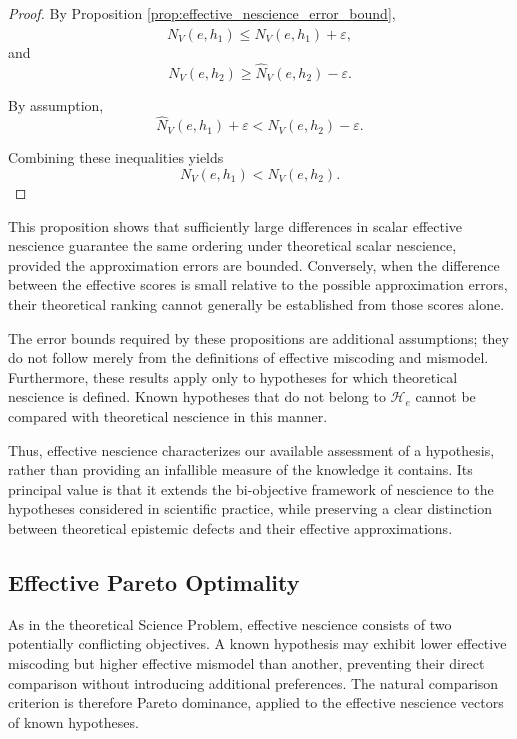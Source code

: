 \begin{proof}
By Proposition
\ref{prop:effective_nescience_error_bound},
\[
N_V(e,h_1)
\leq
\widehat N_V(e,h_1)+\varepsilon,
\]
and
\[
N_V(e,h_2)
\geq
\widehat N_V(e,h_2)-\varepsilon.
\]

By assumption,
\[
\widehat N_V(e,h_1)+\varepsilon
<
\widehat N_V(e,h_2)-\varepsilon.
\]

Combining these inequalities yields
\[
N_V(e,h_1)<N_V(e,h_2).
\]
\end{proof}

This proposition shows that sufficiently large differences in scalar effective nescience guarantee the same ordering under theoretical scalar nescience, provided the approximation errors are bounded. Conversely, when the difference between the effective scores is small relative to the possible approximation errors, their theoretical ranking cannot generally be established from those scores alone.

The error bounds required by these propositions are additional assumptions; they do not follow merely from the definitions of effective miscoding and mismodel. Furthermore, these results apply only to hypotheses for which theoretical nescience is defined. Known hypotheses that do not belong to $\mathcal H_e$ cannot be compared with theoretical nescience in this manner.

Thus, effective nescience characterizes our available assessment of a hypothesis, rather than providing an infallible measure of the knowledge it contains. Its principal value is that it extends the bi-objective framework of nescience to the hypotheses considered in scientific practice, while preserving a clear distinction between theoretical epistemic defects and their effective approximations.


\subsection*{Effective Pareto Optimality}

As in the theoretical Science Problem, effective nescience consists of two potentially conflicting objectives. A known hypothesis may exhibit lower effective miscoding but higher effective mismodel than another, preventing their direct comparison without introducing additional preferences. The natural comparison criterion is therefore Pareto dominance, applied to the effective nescience vectors of known hypotheses.

